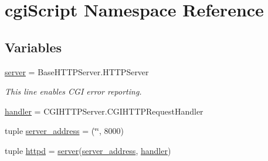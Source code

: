 \hypertarget{namespacecgiScript}{\section{cgi\-Script Namespace Reference}
\label{namespacecgiScript}
}
\subsection*{Variables}
\begin{DoxyCompactItemize}
\item 
\hyperlink{namespacecgiScript_adc901b0e02ec64c67b0a20271d2e7cec}{server} = Base\-H\-T\-T\-P\-Server.\-H\-T\-T\-P\-Server
\begin{DoxyCompactList}\small\item\em This line enables C\-G\-I error reporting. \end{DoxyCompactList}\item 
\hyperlink{namespacecgiScript_a7ebc35e3dd0bc24dd580c8e92bbf07ee}{handler} = C\-G\-I\-H\-T\-T\-P\-Server.\-C\-G\-I\-H\-T\-T\-P\-Request\-Handler
\item 
tuple \hyperlink{namespacecgiScript_a7a16c4aff12e8496b8c738408a1dcde8}{server\-\_\-address} = (\char`\"{}\char`\"{}, 8000)
\item 
tuple \hyperlink{namespacecgiScript_adea267b23595d15b7c3e1b06ab3612f8}{httpd} = \hyperlink{namespacecgiScript_adc901b0e02ec64c67b0a20271d2e7cec}{server}(\hyperlink{namespacecgiScript_a7a16c4aff12e8496b8c738408a1dcde8}{server\-\_\-address}, \hyperlink{namespacecgiScript_a7ebc35e3dd0bc24dd580c8e92bbf07ee}{handler})
\end{DoxyCompactItemize}


